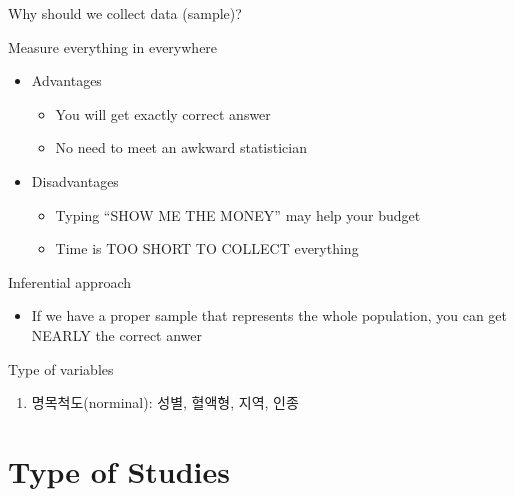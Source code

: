 \documentclass[9pt,ignorenonframetext,xcolor=dvipsnames]{beamer}
\providecommand{\tightlist}{%
  \setlength{\itemsep}{0pt}\setlength{\parskip}{0pt}}
\newlength{\wideitemsep}
\let\olditem\item
\renewcommand{\item}{\setlength{\itemsep}{\wideitemsep}\olditem}
\begin{document}
\begin{frame}{Why should we collect data (sample)?}

\begin{block}{Measure everything in everywhere}

\begin{itemize}
\tightlist
\item
  Advantages

  \begin{itemize}
  \tightlist
  \item
    You will get exactly correct answer
  \item
    No need to meet an awkward statistician
  \end{itemize}
\item
  Disadvantages

  \begin{itemize}
  \tightlist
  \item
    Typing ``SHOW ME THE MONEY'' may help your budget
  \item
    Time is TOO SHORT TO COLLECT everything
  \end{itemize}
\end{itemize}

\end{block}

\begin{block}{Inferential approach}

\begin{itemize}
\tightlist
\item
  If we have a proper sample that represents the whole population, you
  can get NEARLY the correct anwer
\end{itemize}

\end{block}

\end{frame}

\begin{frame}{Type of variables}

\begin{enumerate}
\def\labelenumi{\arabic{enumi}.}
\tightlist
\item
  명목척도(norminal): 성별, 혈액형, 지역, 인종
\end{enumerate}

\end{frame}

\section{Type of Studies}\label{type-of-studies}
\end{document}
